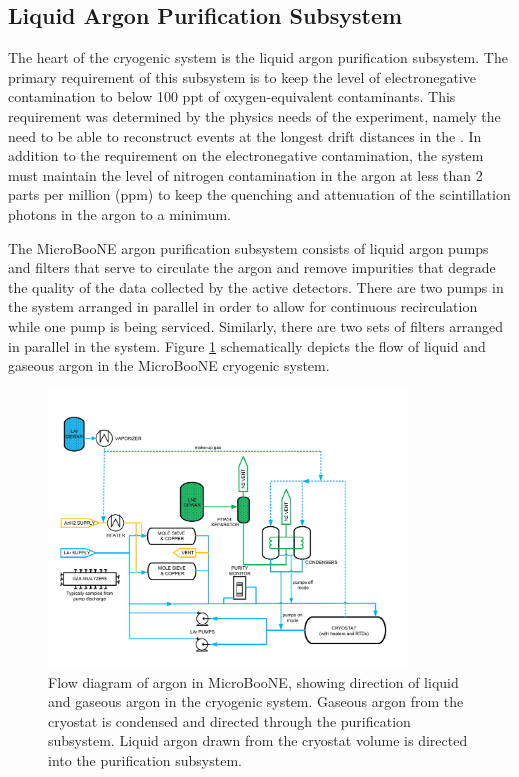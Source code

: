 \subsection{Liquid Argon Purification Subsystem}
\label{sec:purification}

The heart of the cryogenic system is the liquid argon purification subsystem.  The primary requirement of this subsystem is to keep the level of electronegative contamination to below 100 ppt of oxygen-equivalent contaminants.  This requirement was determined by the physics needs of the experiment, namely the need to be able to reconstruct events at the longest drift distances in the \lartpc.  In addition to the requirement on the electronegative contamination, the system must maintain the level of nitrogen contamination in the argon at less than 2 parts per million (ppm) \cite{Jones:2013bca} to keep the quenching and attenuation of the scintillation photons in the argon to a minimum.  

The MicroBooNE argon purification subsystem consists of liquid argon pumps and filters that serve to circulate the argon and remove impurities that degrade the quality of the data collected by the active detectors.  There are two pumps in the system arranged in parallel in order to allow for continuous recirculation while one pump is being serviced.  Similarly, there are two sets of filters arranged in parallel in the system.  Figure \ref{flowdiagram} schematically depicts the flow of liquid and gaseous argon in the MicroBooNE cryogenic system.

\begin{figure}
\centering 
\includegraphics[width=0.85\textwidth]{figures/cryo_flow.pdf}
\caption{Flow diagram of argon in MicroBooNE, showing direction of liquid and gaseous argon in the cryogenic system.  Gaseous argon from the cryostat is condensed and directed through the purification subsystem. Liquid argon drawn from the cryostat volume is directed into the purification subsystem.}
\label{flowdiagram}
\end{figure}



